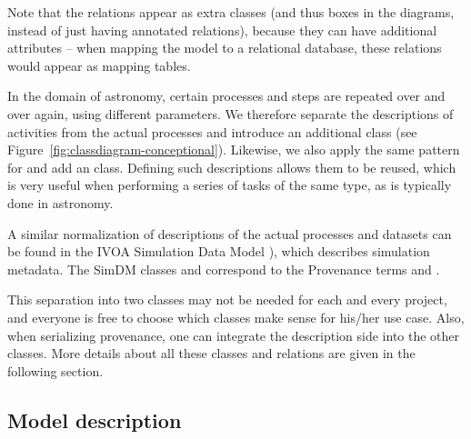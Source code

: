 Note that the relations appear as extra classes (and thus boxes in the diagrams, instead of just having annotated relations), because they can have additional attributes -- when mapping the model to a relational database, these relations would appear as mapping tables.

In the domain of astronomy, certain processes and steps are repeated over and
over again, using different parameters. We therefore separate the descriptions
of activities from the actual processes and introduce an additional
 class (see
Figure~\ref{fig:classdiagram-conceptional}). Likewise, we also apply the same
pattern for  and add an  class.
Defining such descriptions allows them to be reused, which is very useful 
when performing a series of tasks of the same type, as is typically done in 
astronomy. 

A similar normalization of descriptions of the actual processes and datasets 
can be found in the IVOA Simulation Data Model \citep[SimDM, ][]{std:SimDM}),
which describes simulation metadata. The SimDM classes  and  
correspond to the Provenance terms  and .


This separation into two classes may not be needed for each and every project,
and everyone is free to choose which classes make sense for his\slash{}her use
case. Also, when serializing provenance, one can integrate the description side into
the other classes.
More details about all these classes and relations are given in the following
section.





\subsection{Model description}

